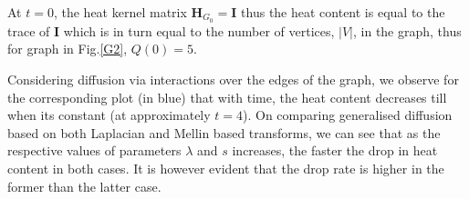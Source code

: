 \documentclass[10pt,a4paper]{article}
\theoremstyle{plain}
\theoremstyle{definition}
\begin{document}
At $t=0$, the heat kernel matrix $\mathbf{H}_{G_0} = \mathbf{I}$ thus the heat content is equal to the trace of  $\mathbf{I}$ which is in turn equal to the number of vertices, $|V|$, in the graph, thus for graph in Fig.\ref{G2}, $Q(0) = 5$.

Considering diffusion via interactions over the edges of the graph, we observe for the corresponding plot (in blue) that with time, the heat content decreases till when its constant (at approximately $t=4$). On comparing generalised diffusion based on both Laplacian and Mellin based transforms, we can see that as the respective values of parameters $\lambda$ and $s$ increases, the faster the drop in heat content in both cases. It is however evident that the drop rate is higher in the former than the latter case. 
 
 
 \newpage
 
\end{document}

